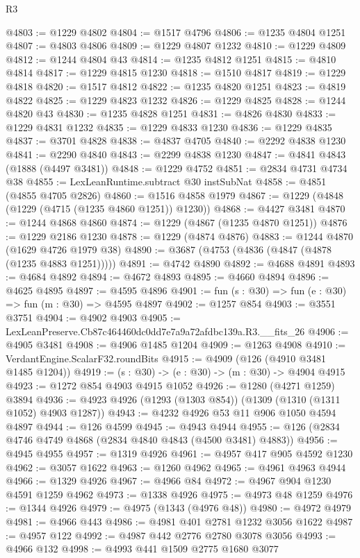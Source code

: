 \begin{lexlean}{R3}
\begin{coremodule}
@4803 := @1229 @4802
@4804 := @1517 @4796
@4806 := @1235 @4804 @1251
@4807 := @4803 @4806
@4809 := @1229 @4807 @1232
@4810 := @1229 @4809
@4812 := @1244 @4804 @43
@4814 := @1235 @4812 @1251
@4815 := @4810 @4814
@4817 := @1229 @4815 @1230
@4818 := @1510 @4817
@4819 := @1229 @4818
@4820 := @1517 @4812
@4822 := @1235 @4820 @1251
@4823 := @4819 @4822
@4825 := @1229 @4823 @1232
@4826 := @1229 @4825
@4828 := @1244 @4820 @43
@4830 := @1235 @4828 @1251
@4831 := @4826 @4830
@4833 := @1229 @4831 @1232
@4835 := @1229 @4833 @1230
@4836 := @1229 @4835
@4837 := @3701 @4828
@4838 := @4837 @4705
@4840 := @2292 @4838 @1230
@4841 := @2290 @4840
@4843 := @2299 @4838 @1230
@4847 := @4841 @4843 (@1888 (@4497 @3481))
@4848 := @1229 @4752
@4851 := @2834 @4731 @4734 @38
@4855 := LexLeanRuntime.subtract @30 instSubNat
@4858 := @4851 (@4855 @4705 @2826)
@4860 := @1516 @4858 @1979
@4867 := @1229 (@4848 (@1229 (@4715 (@1235 @4860 @1251)) @1230))
@4868 := @4427 @3481
@4870 := @1244 @4868 @4860
@4874 := @1229 (@4867 (@1235 @4870 @1251))
@4876 := @1229 @2186 @1230
@4878 := @1229 (@4874 @4876)
@4883 := @1244 @4870 (@1629 @4726 @1979 @38)
@4890 := @3687 (@4753 (@4836 (@4847 (@4878 (@1235 @4883 @1251)))))
@4891 := @4742 @4890
@4892 := @4688 @4891
@4893 := @4684 @4892
@4894 := @4672 @4893
@4895 := @4660 @4894
@4896 := @4625 @4895
@4897 := @4595 @4896
@4901 := fun (s : @30) => fun (e : @30) => fun (m : @30) => @4595 @4897
@4902 := @1257 @854
@4903 := @3551 @3751
@4904 := @4902 @4903
@4905 := LexLeanPreserve.Cb87c464460dc0dd7e7a9a72afdbc139a.R3.__fits_26
@4906 := @4905 @3481
@4908 := @4906 @1485 @1204
@4909 := @1263 @4908
@4910 := VerdantEngine.ScalarF32.roundBits
@4915 := @4909 (@126 (@4910 @3481 @1485 @1204))
@4919 := (s : @30) -> (e : @30) -> (m : @30) -> @4904 @4915
@4923 := @1272 @854 @4903 @4915 @1052
@4926 := @1280 (@4271 @1259) @3894
@4936 := @4923 @4926 (@1293 (@1303 @854)) (@1309 (@1310 (@1311 @1052) @4903 @1287))
@4943 := @4232 @4926 @53 @11 @906 @1050 @4594 @4897
@4944 := @126 @4599
@4945 := @4943 @4944
@4955 := @126 (@2834 @4746 @4749 @4868 (@2834 @4840 @4843 (@4500 @3481) @4883))
@4956 := @4945 @4955
@4957 := @1319 @4926
@4961 := @4957 @417 @905 @4592 @1230
@4962 := @3057 @1622
@4963 := @1260 @4962
@4965 := @4961 @4963 @4944
@4966 := @1329 @4926
@4967 := @4966 @84
@4972 := @4967 @904 @1230 @4591 @1259 @4962
@4973 := @1338 @4926
@4975 := @4973 @48 @1259
@4976 := @1344 @4926
@4979 := @4975 (@1343 (@4976 @48))
@4980 := @4972 @4979
@4981 := @4966 @443
@4986 := @4981 @401 @2781 @1232 @3056 @1622
@4987 := @4957 @122
@4992 := @4987 @442 @2776 @2780 @3078 @3056
@4993 := @4966 @132
@4998 := @4993 @441 @1509 @2775 @1680 @3077

\end{coremodule}
\end{lexlean}
